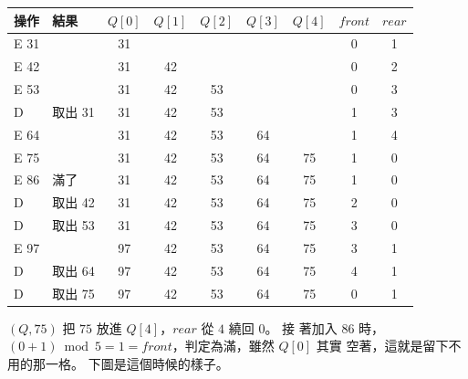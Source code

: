 \begin{center}
\begin{tabular}{llccccccc}
\toprule
操作 & 結果 & $Q[0]$ & $Q[1]$ & $Q[2]$ & $Q[3]$ & $Q[4]$ & $\mathit{front}$ & $\mathit{rear}$ \\
\midrule
E 31 & & 31 & & & & & 0 & 1 \\
E 42 & & 31 & 42 & & & & 0 & 2 \\
E 53 & & 31 & 42 & 53 & & & 0 & 3 \\
D & 取出 31 & \textcolor{black!40}{31} & 42 & 53 & & & 1 & 3 \\
E 64 & & \textcolor{black!40}{31} & 42 & 53 & 64 & & 1 & 4 \\
E 75 & & \textcolor{black!40}{31} & 42 & 53 & 64 & 75 & 1 & 0 \\
E 86 & 滿了 & \textcolor{black!40}{31} & 42 & 53 & 64 & 75 & 1 & 0 \\
D & 取出 42 & \textcolor{black!40}{31} & \textcolor{black!40}{42} & 53 & 64 & 75 & 2 & 0 \\
D & 取出 53 & \textcolor{black!40}{31} & \textcolor{black!40}{42} & \textcolor{black!40}{53} & 64 & 75 & 3 & 0 \\
E 97 & & 97 & \textcolor{black!40}{42} & \textcolor{black!40}{53} & 64 & 75 & 3 & 1 \\
D & 取出 64 & 97 & \textcolor{black!40}{42} & \textcolor{black!40}{53} & \textcolor{black!40}{64} & 75 & 4 & 1 \\
D & 取出 75 & 97 & \textcolor{black!40}{42} & \textcolor{black!40}{53} & \textcolor{black!40}{64} & \textcolor{black!40}{75} & 0 & 1 \\
\bottomrule
\end{tabular}
\end{center}

$(Q, 75)$ 把 $75$ 放進 $Q[4]$，$\mathit{rear}$ 從 $4$ 繞回 $0$。 接
著加入 $86$ 時，$(0 + 1) \bmod 5 = 1 = \mathit{front}$，判定為滿，雖然 $Q[0]$ 其實
空著，這就是留下不用的那一格。 下圖是這個時候的樣子。

\begin{center}
\label{fig:sq-ring}
\end{center}

